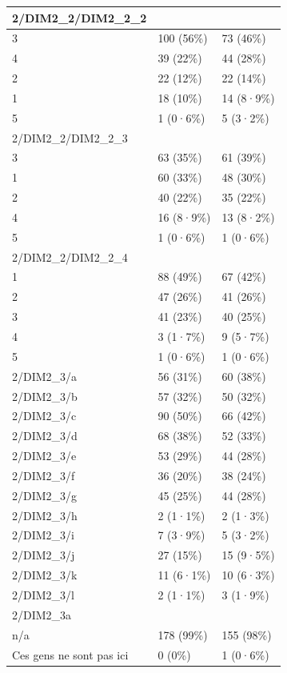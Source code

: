 \documentclass[
]{book}
\begin{document}
\begin{tabular}{l|l|l}
\hline
2/DIM2\_2/DIM2\_2\_2 &  & \\
\hline
3 & 100 (56\%) & 73 (46\%)\\
\hline
4 & 39 (22\%) & 44 (28\%)\\
\hline
2 & 22 (12\%) & 22 (14\%)\\
\hline
1 & 18 (10\%) & 14 (8·9\%)\\
\hline
5 & 1 (0·6\%) & 5 (3·2\%)\\
\hline
2/DIM2\_2/DIM2\_2\_3 &  & \\
\hline
3 & 63 (35\%) & 61 (39\%)\\
\hline
1 & 60 (33\%) & 48 (30\%)\\
\hline
2 & 40 (22\%) & 35 (22\%)\\
\hline
4 & 16 (8·9\%) & 13 (8·2\%)\\
\hline
5 & 1 (0·6\%) & 1 (0·6\%)\\
\hline
2/DIM2\_2/DIM2\_2\_4 &  & \\
\hline
1 & 88 (49\%) & 67 (42\%)\\
\hline
2 & 47 (26\%) & 41 (26\%)\\
\hline
3 & 41 (23\%) & 40 (25\%)\\
\hline
4 & 3 (1·7\%) & 9 (5·7\%)\\
\hline
5 & 1 (0·6\%) & 1 (0·6\%)\\
\hline
2/DIM2\_3/a & 56 (31\%) & 60 (38\%)\\
\hline
2/DIM2\_3/b & 57 (32\%) & 50 (32\%)\\
\hline
2/DIM2\_3/c & 90 (50\%) & 66 (42\%)\\
\hline
2/DIM2\_3/d & 68 (38\%) & 52 (33\%)\\
\hline
2/DIM2\_3/e & 53 (29\%) & 44 (28\%)\\
\hline
2/DIM2\_3/f & 36 (20\%) & 38 (24\%)\\
\hline
2/DIM2\_3/g & 45 (25\%) & 44 (28\%)\\
\hline
2/DIM2\_3/h & 2 (1·1\%) & 2 (1·3\%)\\
\hline
2/DIM2\_3/i & 7 (3·9\%) & 5 (3·2\%)\\
\hline
2/DIM2\_3/j & 27 (15\%) & 15 (9·5\%)\\
\hline
2/DIM2\_3/k & 11 (6·1\%) & 10 (6·3\%)\\
\hline
2/DIM2\_3/l & 2 (1·1\%) & 3 (1·9\%)\\
\hline
2/DIM2\_3a &  & \\
\hline
n/a & 178 (99\%) & 155 (98\%)\\
\hline
Ces gens ne sont pas ici & 0 (0\%) & 1 (0·6\%)\\

\end{tabular}
\end{document}
